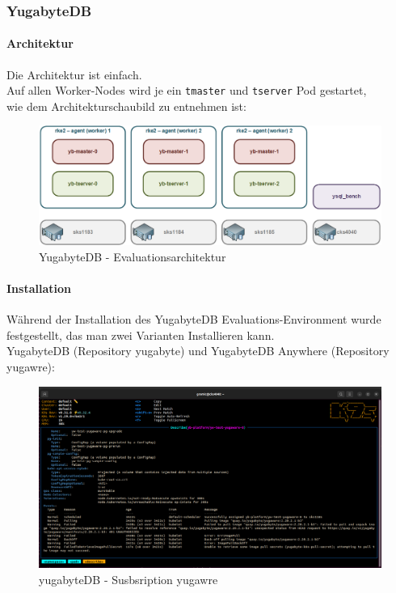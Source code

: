 
\begin{flushleft}
    \subsubsection{YugabyteDB}
    \paragraph{Architektur}
    Die Architektur ist einfach.\\
    Auf allen Worker-Nodes wird je ein \texttt{tmaster} und \texttt{tserver} Pod gestartet,\\
    wie dem Architekturschaubild zu entnehmen ist:
    \begin{figure}[H]
        \centering
        \includegraphics[width=0.8\linewidth]{source/implementation/evaluation/postgresql_ha_solutions/yugabytedb/yugabytedb-evaluation-architecture}
        \caption{YugabyteDB - Evaluationsarchitektur}
        \label{fig:yugabytedb-evaluation-architecture}
    \end{figure}
    \paragraph{Installation}
    Während der Installation des YugabyteDB Evaluations-Environment wurde festgestellt, das man zwei Varianten Installieren kann.\\
    YugabyteDB (Repository yugabyte) und YugabyteDB Anywhere (Repository yugawre):
    \begin{figure}[H]
        \centering
        \includegraphics[width=1\linewidth]{source/implementation/evaluation/platforms/yugabytedb_pod_installation_subscription_interrup}
        \caption{yugabyteDB - Susbsription yugawre}
        \label{fig:yugabytedb_pod_installation_subscription_interrup}
    \end{figure}
\end{flushleft}
